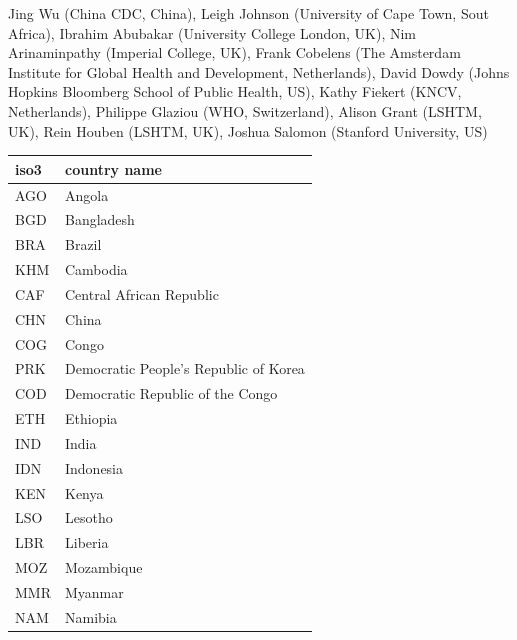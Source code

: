 \documentclass[12pt]{article}
\begin{document}
Jing Wu (China CDC, China), Leigh Johnson (University of Cape Town, Sout
Africa), Ibrahim Abubakar (University College London, UK), Nim Arinaminpathy (Imperial College,
UK), Frank Cobelens (The Amsterdam Institute for Global Health and Development, Netherlands),
David Dowdy (Johns Hopkins Bloomberg School of Public Health, US), Kathy Fiekert
(KNCV, Netherlands), Philippe Glaziou (WHO, Switzerland),
Alison Grant (LSHTM, UK), Rein Houben (LSHTM, UK), Joshua Salomon (Stanford University, US)


\begin{table}[]
  \centering
\begin{tabular}{|l|l|}
\hline
\textbf{iso3} & \textbf{country name}                 \\ \hline
AGO           & Angola                                \\ \hline
BGD           & Bangladesh                            \\ \hline
BRA           & Brazil                                \\ \hline
KHM           & Cambodia                              \\ \hline
CAF           & Central African Republic              \\ \hline
CHN           & China                                 \\ \hline
COG           & Congo                                 \\ \hline
PRK           & Democratic People's Republic of Korea \\ \hline
COD           & Democratic Republic of the Congo      \\ \hline
ETH           & Ethiopia                              \\ \hline
IND           & India                                 \\ \hline
IDN           & Indonesia                             \\ \hline
KEN           & Kenya                                 \\ \hline
LSO           & Lesotho                               \\ \hline
LBR           & Liberia                               \\ \hline
MOZ           & Mozambique                            \\ \hline
MMR           & Myanmar                               \\ \hline
NAM           & Namibia                               \\ \hline

\end{tabular}
\end{table}
\end{document}
